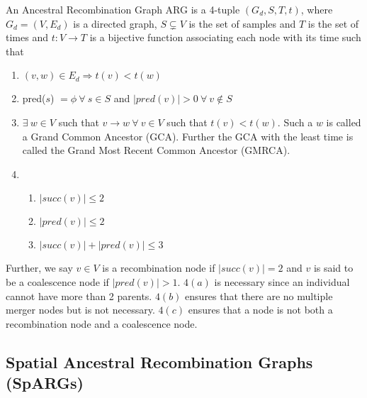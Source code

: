 \begin{definition} An Ancestral Recombination Graph ARG is a 4-tuple $(G_d, S, T, t)$, where $G_d = (V, E_d)$ is a directed graph, $S \subsetneq V$ is the set of samples and $T$ is the set of times and $t: V \rightarrow T$ is a bijective function associating each node with its time such that 
\begin{enumerate}
    \item $(v,w) \in E_d \Rightarrow t(v) < t(w)$ 
    \item pred($s$) $= \phi \ \forall \ s \in S$ and $|pred(v)|>0 \ \forall \ v \notin S$
    \item $\exists \ w \in V $ such that $v \rightarrow w \ \forall \ v \in V$ such that $t(v) < t(w)$. Such a $w$ is called a Grand Common Ancestor (GCA). Further the GCA with the least time is called the Grand Most Recent Common Ancestor (GMRCA). 
    \item
    \begin{enumerate}
        \item $|succ(v)| \leq 2$
        \item $|pred(v)| \leq 2 $
        \item $|succ(v)| + |pred(v)| \leq 3$
    \end{enumerate}
\end{enumerate}
Further, we say $v \in V$ is a recombination node if $|succ(v)| = 2$ and $v$ is said to be a coalescence node if $|pred(v)| > 1$. $4(a)$ is necessary since an individual cannot have more than 2 parents. $4(b)$ ensures that there are no multiple merger nodes but is not necessary. $4(c)$ ensures that a node is not both a recombination node and a coalescence node. 
\end{definition}

\subsection{Spatial Ancestral Recombination Graphs (SpARGs)}

